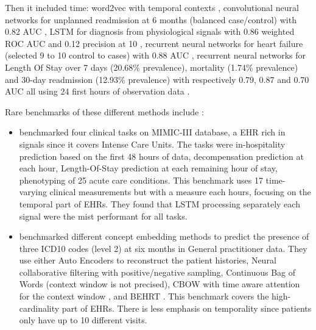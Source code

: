 \documentclass[french,12pt,twoside,a4paper]{book}
\begin{document}
\begin{appendices}
  Then it included time: word2vec with temporal contexts
  \citep{beam2019clinical}, \textcolor{M}{convolutional neural networks} for
  \textcolor{O}{unplanned readmission} at 6 months (balanced case/control) with
  \textcolor{S}{0.82 AUC} \citep{nguyen2016mathtt}, \textcolor{M}{LSTM} for
  \textcolor{O}{diagnosis} from physiological signals with \textcolor{S}{0.86
    weighted ROC AUC and 0.12 precision at 10} \citep{lipton2016learning},
  \textcolor{M}{recurrent neural networks} for \textcolor{O}{heart failure}
  (selected 9 to 10 control to cases) with \textcolor{S}{0.88 AUC}
  \citep{choi2017using}, \textcolor{M}{recurrent neural networks} for
  \textcolor{O}{Length Of Stay over 7 days} (20.68\% prevalence),
  \textcolor{O}{mortality} (1.74\% prevalence) and \textcolor{O}{30-day
    readmission} (12.93\% prevalence) with respectively \textcolor{S}{0.79, 0.87 and
    0.70 AUC} all using 24 first hours of observation data
  \citep{beaulieu2021machine}.


  Rare benchmarks of these different methods include :
  \begin{itemize}
    \item \cite{harutyunyan2019multitask} benchmarked four clinical tasks on
          MIMIC-III database, a EHR rich in signals since it covers Intense Care
          Units. The tasks were in-hospitality prediction based on the first 48
          hours of data, decompensation prediction at each hour, Length-Of-Stay
          prediction at each remaining hour of stay, phenotyping of 25 acute care
          conditions. This benchmark uses 17 time-varying clinical measurements
          but with a measure each hours, focusing on the temporal part of EHRs.
          They found that LSTM processing separately each signal were the mist
          performant for all tasks.
    \item \cite{solares2021transfer} benchmarked different concept embedding
          methods to predict the presence of three ICD10 codes (level 2) at six
          months in General practitioner data. They use either Auto Encoders to
          reconstruct the patient histories, Neural collaborative filtering  with
          positive/negative sampling, Continuous Bag of Words (context window is
          not precised), CBOW with time aware attention for the context window
          \citep{cai2018medical}, and BEHRT \citep{li2020behrt}. This benchmark
          covers the high-cardinality part of EHRs. There is less emphasis on
          temporality since patients only have up to 10 different visits.
  \end{itemize}



\end{appendices}
\end{document}
